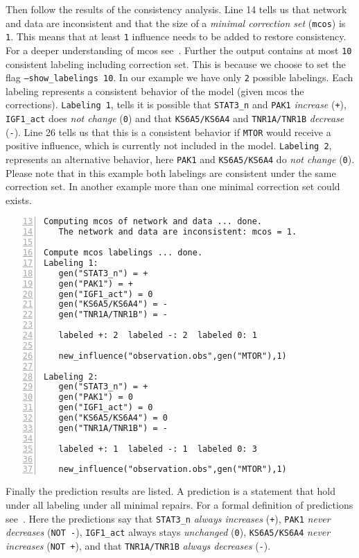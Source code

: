 \documentclass{article}
\begin{document}
Then follow the results of the consistency analysis.
Line 14 tells us that network and data are inconsistent 
and that the size of a \emph{minimal correction set} (\texttt{mcos}) is \texttt{1}.
This means that at least \texttt{1} influence needs to be added to restore consistency.
For a deeper understanding of mcos see~\cite{samaga13a}.
Further the output contains at most \texttt{10} consistent labeling including correction set. 
This is because we choose to set the flag \texttt{--show\_labelings 10}.
In our example we have only \texttt{2} possible labelings. 
Each labeling represents a consistent behavior of the model (given mcos the corrections).
\texttt{Labeling 1},
tells it is possible that 
\texttt{STAT3\_n} and \texttt{PAK1} \emph{increase} (\texttt{+}),
\texttt{IGF1\_act} does \emph{not change} (\texttt{0}) and that
\texttt{KS6A5/KS6A4} and \texttt{TNR1A/TNR1B} \emph{decrease} (\texttt{-}).
Line 26 tells us that this is a consistent behavior if \texttt{MTOR} would receive a positive influence, 
which is currently not included in the model.
\texttt{Labeling 2}, represents an alternative behavior,
 here  \texttt{PAK1} and \texttt{KS6A5/KS6A4} do \emph{not change} (\texttt{0}).
Please note that in this example both labelings are consistent under the same correction set.
In another example more than one minimal correction set could exists.

\begin{Verbatim}[frame=single,numbers=left,firstnumber=13]  
Computing mcos of network and data ... done.
   The network and data are inconsistent: mcos = 1.
  
Compute mcos labelings ... done.
Labeling 1:
   gen("STAT3_n") = +
   gen("PAK1") = +
   gen("IGF1_act") = 0
   gen("KS6A5/KS6A4") = -
   gen("TNR1A/TNR1B") = -

   labeled +: 2  labeled -: 2  labeled 0: 1 

   new_influence("observation.obs",gen("MTOR"),1)
   
Labeling 2:
   gen("STAT3_n") = +
   gen("PAK1") = 0
   gen("IGF1_act") = 0
   gen("KS6A5/KS6A4") = 0
   gen("TNR1A/TNR1B") = -

   labeled +: 1  labeled -: 1  labeled 0: 3 
   
   new_influence("observation.obs",gen("MTOR"),1)
\end{Verbatim}

Finally the prediction results are listed.
A prediction is a statement that hold under all labeling under all minimal repairs. 
For a formal definition of predictions see~\cite{sthiele15}.
Here the predictions say that 
\texttt{STAT3\_n} \emph{always increases} (\texttt{+}),
\texttt{PAK1} \emph{never decreases} (\texttt{NOT -}),
\texttt{IGF1\_act} always stays \emph{unchanged} (\texttt{0}),
\texttt{KS6A5/KS6A4} \emph{never increases} (\texttt{NOT +}), and that
\texttt{TNR1A/TNR1B} \emph{always decreases} (\texttt{-}).
\end{document}
